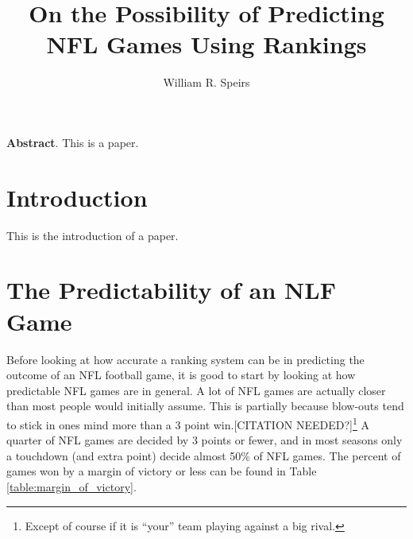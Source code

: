 \documentclass[11pt]{article}
\title{On the Possibility of Predicting NFL Games Using Rankings}
\author{William R. Speirs}
\date{} %
\begin{document}
\maketitle

\small
\textbf{Abstract}. This is a paper.\\
\normalsize


\section{Introduction}

This is the introduction of a paper.

\section{The Predictability of an NLF Game}

Before looking at how accurate a ranking system can be in predicting the outcome of an NFL football game, it is good to start by looking at how predictable NFL games are in general. A lot of NFL games are actually closer than most people would initially assume. This is partially because blow-outs tend to stick in ones mind more than a 3 point win.[CITATION NEEDED?]\footnote{Except of course if it is ``your'' team playing against a big rival.} A quarter of NFL games are decided by 3 points or fewer, and in most seasons only a touchdown (and extra point) decide almost 50\% of NFL games. The percent of games won by a margin of victory or less can be found in Table \ref{table:margin_of_victory}.
\end{document}
